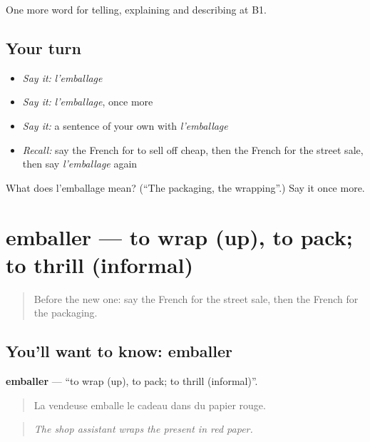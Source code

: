 \begin{grammarlens}[title={What you've built}]
One more word for telling, explaining and describing at B1.
\end{grammarlens}

\subsection*{Your turn}
\begin{itemize}
\raggedright
  \item \emph{Say it:} \emph{l'emballage}
  \item \emph{Say it:} \emph{l'emballage}, once more
  \item \emph{Say it:} a sentence of your own with \emph{l'emballage}
  \item \emph{Recall:} say the French for to sell off cheap, then the French for the street sale, then say \emph{l'emballage} again
\end{itemize}

\begin{tcolorbox}[breakable,colback=teal!4,colframe=teal!35!black,title={Before you move on}]
What does l'emballage mean? (\textquotedblleft{}The packaging, the wrapping\textquotedblright{}.) Say it once more.
\end{tcolorbox}
\section[emballer]{emballer — to wrap (up), to pack; to thrill (informal)}

\label{lesson:FR-C453-emballer}



\begin{quote}
Before the new one: say the French for the street sale, then the French for the packaging.
\end{quote}

\subsection*{You'll want to know: emballer}
\textbf{emballer} — \textquotedblleft{}to wrap (up), to pack; to thrill (informal)\textquotedblright{}.

\begin{quote}
La vendeuse emballe le cadeau dans du papier rouge.
\end{quote}

\begin{quote}
\emph{The shop assistant wraps the present in red paper.}
\end{quote}

